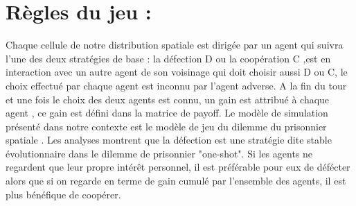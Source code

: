 \documentclass[30pt]{report}
\begin{document}
\section{Règles du jeu :}
Chaque cellule de notre distribution spatiale est dirigée par un agent qui suivra l'une des deux stratégies de base : la défection D ou la coopération C ,est en interaction avec un autre agent de son voisinage qui doit choisir aussi D ou C, le choix effectué par chaque agent est inconnu par l'agent adverse. A la fin du tour et une fois le choix des deux agents est connu, un gain  est attribué à chaque agent , ce gain est défini dans la matrice de payoff.
	\newline
	\newline
	Le modèle de simulation présenté dans notre contexte est le modèle de jeu du dilemme du prisonnier spatiale .
	\newline
	\newline
	Les analyses montrent que la défection est une stratégie dite stable évolutionnaire dans le dilemme de prisonnier "one-shot".
	\newline
	\newline
	Si les agents ne regardent que leur propre intérêt personnel, il est préférable pour eux de défécter alors que si on regarde en terme de gain cumulé par l'ensemble des agents, il est plus bénéfique de coopérer. 
	\newline
\end{document}
